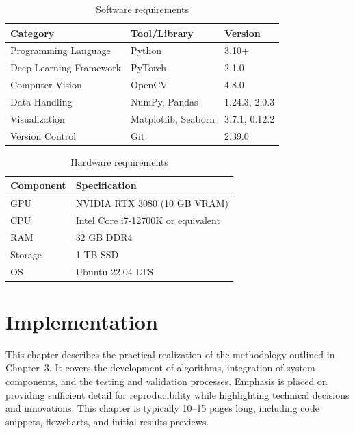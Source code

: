 \documentclass[12pt,a4paper]{report}
\theoremstyle{definition}
\theoremstyle{remark}
\begin{document}
\begin{table}[htbp]
    \centering
    \caption{Software requirements}
    \label{tab:software-req}
    \begin{tabular}{|l|l|l|}
    \hline
    \textbf{Category} & \textbf{Tool/Library} & \textbf{Version} \\
    \hline
    Programming Language & Python & 3.10+ \\
    Deep Learning Framework & PyTorch & 2.1.0 \\
    Computer Vision & OpenCV & 4.8.0 \\
    Data Handling & NumPy, Pandas & 1.24.3, 2.0.3 \\
    Visualization & Matplotlib, Seaborn & 3.7.1, 0.12.2 \\
    Version Control & Git & 2.39.0 \\
    \hline
    \end{tabular}
\end{table}

\begin{table}[htbp]
    \centering
    \caption{Hardware requirements}
    \label{tab:hardware-req}
    \begin{tabular}{|l|l|}
    \hline
    \textbf{Component} & \textbf{Specification} \\
    \hline
    GPU & NVIDIA RTX 3080 (10 GB VRAM) \\
    CPU & Intel Core i7-12700K or equivalent \\
    RAM & 32 GB DDR4 \\
    Storage & 1 TB SSD \\
    OS & Ubuntu 22.04 LTS \\
    \hline
    \end{tabular}
\end{table}



\chapter{Implementation}

This chapter describes the practical realization of the methodology outlined in Chapter~3. It covers the development of algorithms, integration of system components, and the testing and validation processes. Emphasis is placed on providing sufficient detail for reproducibility while highlighting technical decisions and innovations. This chapter is typically 10--15 pages long, including code snippets, flowcharts, and initial results previews.
\end{document}
